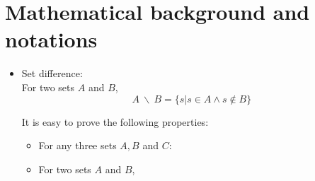 \section{Mathematical background and notations}
\begin{itemize}
	\item Set difference: \\
	For two sets $A$ and $B$, 
	\[ A \ \backslash \ B = \{s | s \in A \wedge s \notin B\} \]
	
	It is easy to prove the following properties: 
 	\begin{itemize}
	 	\item For any three sets $A,B$ and $C$: 
	 	\item For two sets $A$ and $B$,
 	\end{itemize}

\end{itemize}